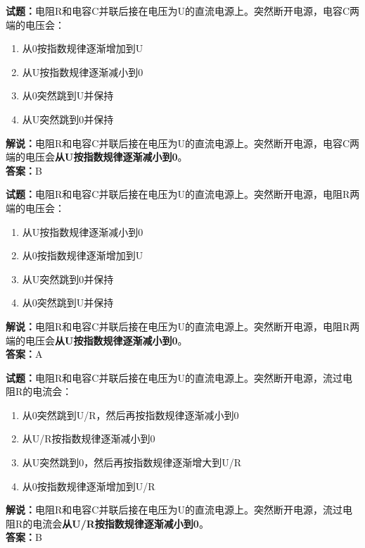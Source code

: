 \documentclass{ctexbook}
\begin{document}
\bigskip


\noindent\textbf{试题：}电阻R和电容C并联后接在电压为U的直流电源上。突然断开电源，电容C两端的电压会：
\begin{enumerate}[leftmargin=3em]
\item 从0按指数规律逐渐增加到U
\item 从U按指数规律逐渐减小到0
\item 从0突然跳到U并保持
\item 从U突然跳到0并保持
\end{enumerate}
\noindent\textbf{解说：}电阻R和电容C并联后接在电压为U的直流电源上。突然断开电源，电容C两端的电压会\textbf{从U按指数规律逐渐减小到0}。\\\noindent\textbf{答案：}B



\bigskip


\noindent\textbf{试题：}电阻R和电容C并联后接在电压为U的直流电源上。突然断开电源，电阻R两端的电压会：
\begin{enumerate}[leftmargin=3em]
\item 从U按指数规律逐渐减小到0
\item 从0按指数规律逐渐增加到U
\item 从U突然跳到0并保持
\item 从0突然跳到U并保持
\end{enumerate}
\noindent\textbf{解说：}电阻R和电容C并联后接在电压为U的直流电源上。突然断开电源，电阻R两端的电压会\textbf{从U按指数规律逐渐减小到0}。\\\noindent\textbf{答案：}A


\bigskip


\noindent\textbf{试题：}电阻R和电容C并联后接在电压为U的直流电源上。突然断开电源，流过电阻R的电流会：
\begin{enumerate}[leftmargin=3em]
\item 从0突然跳到U/R，然后再按指数规律逐渐减小到0
\item 从U/R按指数规律逐渐减小到0
\item 从U突然跳到0，然后再按指数规律逐渐增大到U/R
\item 从0按指数规律逐渐增加到U/R
\end{enumerate}
\noindent\textbf{解说：}电阻R和电容C并联后接在电压为U的直流电源上。突然断开电源，流过电阻R的电流会\textbf{从U/R按指数规律逐渐减小到0}。\\\noindent\textbf{答案：}B




\bigskip
\end{document}
